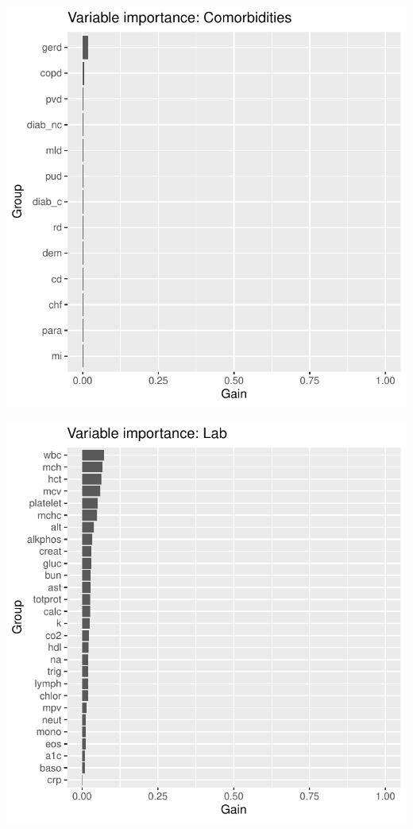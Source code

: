 \documentclass[12pt]{article}
\begin{document}
\begin{center}
\includegraphics[width=\textwidth]{figures/vi_group_Comorbidities_.pdf}
\end{center}
\begin{center}
\includegraphics[width=\textwidth]{figures/vi_group_Lab_.pdf}
\end{center}
\end{document}
